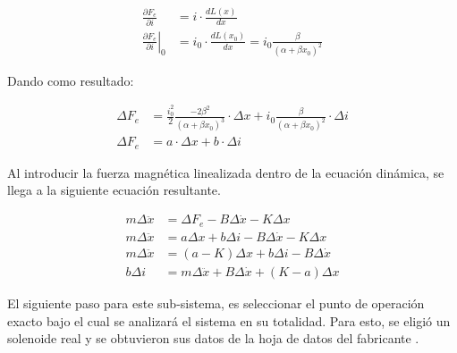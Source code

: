 \documentclass[journal]{IEEEtran}
\begin{document}
\begin{equation}
\begin{aligned}
    \frac{\partial F_{e}}{\partial i}                      &= i \cdot \frac{dL(x)}{dx} \\
    \left. \frac{\partial F_{e}}{\partial i} \right|_{0} &= i_{0} \cdot \frac{dL(x_{0})}{dx} = i_{0} \frac{\beta}{(\alpha + \beta x_{0})^2}
\end{aligned}
\label{eq:derivadaParcial_i}
\end{equation}

Dando como resultado: 

\begin{equation}
\begin{aligned}
    \Delta F_{e} &= \frac{i_{0}^2}{2} \frac{-2 \beta^2}{(\alpha + \beta x_{0})^3} \cdot \Delta x + i_{0} \frac{\beta}{(\alpha + \beta x_{0})^2} \cdot \Delta i \\
    \Delta F_{e} &= a \cdot \Delta x + b \cdot \Delta i
\end{aligned}
\label{eq:resultado_serieTaylor}
\end{equation}

Al introducir la fuerza magnética linealizada dentro de la ecuación dinámica, se llega 
a la siguiente ecuación resultante.

\begin{equation}
\begin{aligned}
    m \Delta \ddot{x}   &= \Delta F_{e} -B\Delta \dot{x} - K\Delta x \\
    m \Delta \ddot{x}   &= a\Delta x + b\Delta i - B\Delta \dot{x} - K\Delta x \\
    m \Delta \ddot{x}   &= (a - K)\Delta x + b\Delta i - B\Delta \dot{x} \\
    b \Delta i          &= m \Delta \ddot{x} + B\Delta \dot{x} + (K - a)\Delta x
\end{aligned}
\label{eq:dinamica_SolenoideResultante}
\end{equation}

El siguiente paso para este sub-sistema, es seleccionar el punto de operación exacto bajo el cual
se analizará el sistema en su totalidad. Para esto, se eligió un solenoide real y se obtuvieron sus
datos de la hoja de datos del fabricante \cite{geeplus_skf0420}.
\end{document}
